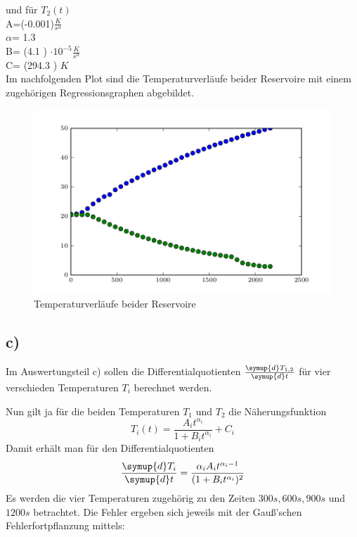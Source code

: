 und für $T_2(t)$\\

A=(-0.001)$\frac{K}{s^\alpha}$ \\
$\alpha$= 1.3  \\
B= (4.1 ) $\cdot 10^{-5}\frac{K}{s^\alpha}$\\
C= (294.3 ) $K$ \\

Im nachfolgenden Plot sind die Temperaturverläufe beider Reservoire mit einem zugehörigen Regressionsgraphen abgebildet.

\begin{figure}
  \centering
  \includegraphics{build/plot.pdf}
  \caption{Temperaturverläufe beider Reservoire}
  \label{fig:temperaturverlauf}
\end{figure}


\subsection{c)}
Im Auswertungsteil c) sollen die Differentialquotienten $\frac{\symup{d}T_{1,2}}{\symup{d}t}$
für vier verschieden Temperaturen $T_i$ berechnet werden.

Nun gilt ja für die beiden Temperaturen $T_1$ und $T_2$ die Näherungsfunktion
\begin{equation}
	T_i(t) = \frac{A_i t^{\alpha_i}}{1 + B_i t^{\alpha_i}} + C_i
\end{equation}
Damit erhält man für den Differentialquotienten
\begin{equation}
	\frac{\symup{d}T_i}{\symup{d}t} = \frac{\alpha_i A_i t^{\alpha_i - 1}}{(1 + B_i t^{\alpha_i})^2}
\end{equation}
Es werden die vier Temperaturen zugehörig zu den Zeiten $300s, 600s, 900s$ und $1200s$ betrachtet.
Die Fehler ergeben sich jeweils mit der Gauß'schen Fehlerfortpflanzung mittels:


